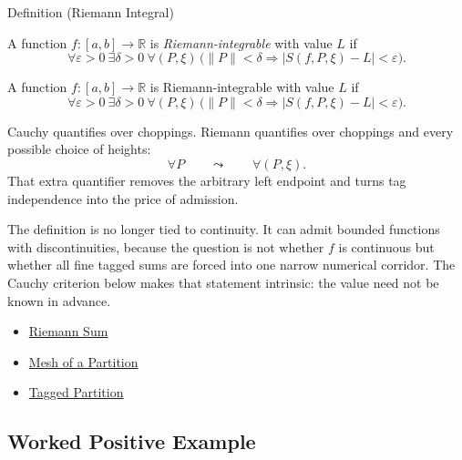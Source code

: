 \begin{definitionbox}{Definition (Riemann Integral)}
\begin{definition}
\label{def:riemann-integral}
A function \(f:[a,b]\to\mathbb R\) is \emph{Riemann-integrable} with value
\(L\) if
\[
  \forall\varepsilon>0\ \exists\delta>0\ \forall(P,\xi)\,
  \bigl(\|P\|<\delta\Rightarrow |S(f,P,\xi)-L|<\varepsilon\bigr).
\]
\end{definition}
\end{definitionbox}

\begin{remark*}
A function \(f:[a,b]\to\mathbb R\) is Riemann-integrable with value \(L\) if
\[
  \forall\varepsilon>0\ \exists\delta>0\ \forall(P,\xi)\,
  \bigl(\|P\|<\delta\Rightarrow |S(f,P,\xi)-L|<\varepsilon\bigr).
\]
\end{remark*}

\begin{remark*}[Interpretation]
Cauchy quantifies over choppings. Riemann quantifies over choppings and every
possible choice of heights:
\[
  \forall P\qquad\leadsto\qquad \forall(P,\xi).
\]
That extra quantifier removes the arbitrary left endpoint and turns tag
independence into the price of admission.


The definition is no longer tied to continuity. It can admit bounded functions
with discontinuities, because the question is not whether \(f\) is continuous
but whether all fine tagged sums are forced into one narrow numerical corridor.
The Cauchy criterion below makes that statement intrinsic: the value need not
be known in advance.
\end{remark*}

\begin{dependencies}
\begin{itemize}
  \item \hyperref[def:riemann-sum]{Riemann Sum}
  \item \hyperref[def:partition-mesh]{Mesh of a Partition}
  \item \hyperref[def:tagged-partition-integration]{Tagged Partition}
\end{itemize}
\end{dependencies}

\subsection*{Worked Positive Example}

